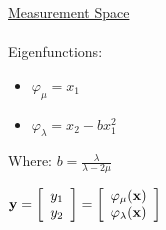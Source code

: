 \documentclass[varwidth, border=5pt]{standalone}
\begin{document}
%
%
%
%
%

\underline{Measurement Space}\\
\\
Eigenfunctions:
\begin{itemize}
 \item $\varphi_\mu=x_1$
 \item $\varphi_\lambda=x_2-b x^2_1$
\end{itemize}

Where:
$b=\frac{\lambda}{\lambda-2\mu}$

\begin{math}
{\bf y} =
\left[
\begin{array}{c}
    y_1\\
    y_2\\
\end{array}
\right] =
\left[
\begin{array}{c}
    \varphi_\mu({\bf x})\\
    \varphi_\lambda({\bf x})\\
\end{array}
\right]
\end{math}
\end{document}
